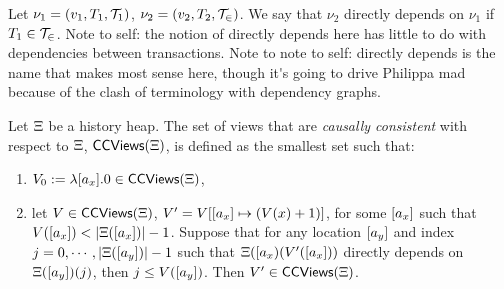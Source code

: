 \begin{definition}
Let $\nu_1 = (v_1, T_1, \mathcal{T}_1)$, $\nu_2 = (v_2, T_2, \mathcal{T_2})$. 
We say that $\nu_2$ directly depends on $\nu_1$ if $T_1 \in \mathcal{T_2}$. 
\ac{Note to self: the notion of directly depends here has little to do with dependencies 
between transactions. Note to note to self: directly depends is the name that 
makes most sense here, though it's going to drive Philippa mad because of the 
clash of terminology with dependency graphs.}

Let $\Xi$ be a history heap. The set of views that are \emph{causally consistent} 
with respect to $\Xi$, $\mathsf{CCViews}(\Xi)$, is defined as the smallest set such that: 
\begin{enumerate} 
\item $V_0 := \lambda [a_x].0 \in \mathsf{CCViews}(\Xi)$, 
\item let $V \in \mathsf{CCViews}(\Xi)$, $V' = V[[a_x] \mapsto (V(x) + 1)]$, 
for some $[a_x]$ such that $V([a_x]) < \lvert \Xi([a_x]) \rvert - 1$.
Suppose that for any location $[a_y]$ and 
index $j = 0, \cdots, \lvert \Xi([a_y]) \rvert -1$ such that $\Xi([a_{x})(V'([a_x]))$ 
directly depends on $\Xi([a_y])(j)$, then $j \leq V([a_y])$. Then 
$V' \in \mathsf{CCViews}(\Xi)$.
\end{enumerate}
\end{definition}

